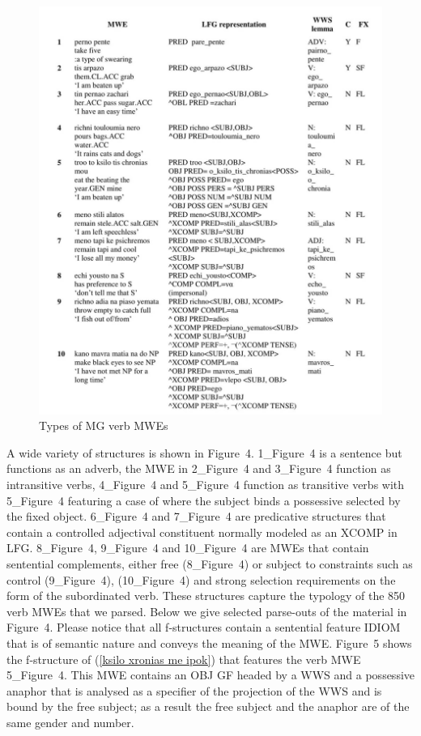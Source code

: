 \documentclass[output=paper,
modfonts
]{langscibook}
\begin{document}
\begin{figure} 
\caption{Types of MG verb MWEs}
\centering
  \includegraphics[width=1\textwidth]{figures/MWE_correct_table-1}
\end{figure}
A wide variety of structures is shown in  Figure~4. 1\_Figure~4 is a sentence but functions as an adverb, the MWE in 2\_Figure~4 and 3\_Figure~4 function as intransitive verbs, 4\_Figure~4 and 5\_Figure~4 function as transitive verbs with 5\_Figure~4 featuring a case of where the subject binds a possessive selected by the fixed object. 6\_Figure~4 and 7\_Figure~4 are predicative structures that contain a controlled adjectival constituent normally modeled as an XCOMP in LFG. 8\_Figure~4, 9\_Figure~4 and 10\_Figure~4 are MWEs that contain sentential complements, either free (8\_Figure~4) or subject to constraints such as control (9\_Figure~4), (10\_Figure~4) and strong selection requirements on the form of the subordinated verb. These structures capture the typology of the 850 verb MWEs that we parsed. 
Below we give selected parse-outs of the material in Figure~4. Please notice that all f-structures contain a sentential feature IDIOM that is of semantic nature and conveys the meaning of the MWE.
Figure~5 shows the f-structure of (\ref{ksilo xronias me ipok}) that features the verb MWE 5\_Figure~4. This MWE contains an OBJ GF headed by a WWS and a possessive anaphor that is analysed as a specifier of  the projection of the WWS and is bound by the free subject; as a result the free subject and the anaphor are of the same gender and number.  
\end{document}
